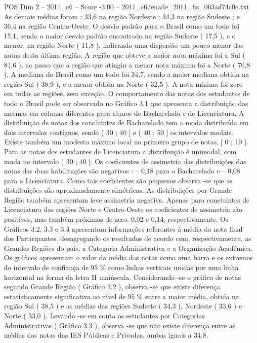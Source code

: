 \begin{textsample}{POS Dim 2 – 2011\_c6 – Score -3.00 – 2011\_c6/enade\_2011\_fis\_063ad74c0e.txt}
As demais médias foram : 33,6 na região Nordeste ; 34,3 na região Sudeste ; e 36,4 na região Centro-Oeste.
O desvio padrão para o Brasil como um todo foi 15,1, sendo o maior desvio padrão encontrado na região Sudeste ( 17,5 ), e o menor, na região Norte ( 11,8 ), indicando uma dispersão um pouco menor das notas desta última região.
A região que obteve a maior nota máxima foi a Sul ( 81,6 ), ao passo que a região que atingiu a menor nota máxima foi a Norte ( 70,8 ).
A mediana do Brasil como um todo foi 34,7, sendo a maior mediana obtida na região Sul ( 38,9 ), e a menor obtida na Norte ( 32,5 ).
A nota mínima foi zero em todas as regiões, sem exceção.
O comportamento das notas dos estudantes de todo o Brasil pode ser observado no Gráfico 3.1 que apresenta a distribuição das mesmas em colunas diferentes para alunos de Bacharelado e de Licenciatura.
A distribuição de notas dos concluintes de Bacharelado tem a moda distribuída em dois intervalos contíguos, sendo ( 30 ; 40 ] e ( 40 ; 50 ] os intervalos modais.
Existe também um modesto máximo local no primeiro grupo de notas, [ 0 ; 10 ].
Para as notas dos estudantes de Licenciatura a distribuição é unimodal, com moda no intervalo ( 30 ; 40 ].
Os coeficientes de assimetria das distribuições das notas das duas habilitações são negativos : – 0,18 para o Bacharelado e – 0,08 para a Licenciatura.
Como tais coeficientes são pequenos observa -se que as distribuições são aproximadamente simétricas.
As distribuições por Grande Região também apresentam leve assimetria negativa.
Apenas para concluintes de Licenciatura das regiões Norte e Centro-Oeste os coeficientes de assimetria são positivos, mas também próximos de zero, 0,02 e 0,14, respectivamente.
Os Gráficos 3.2, 3.3 e 3.4 apresentam informações referentes à média da nota final dos Participantes, desagregando os resultados de acordo com, respectivamente, as Grandes Regiões do país, a Categoria Administrativa e a Organização Acadêmica.
Os gráficos apresentam o valor da média das notas como uma barra e os extremos do intervalo de confiança de 95 \% como linhas verticais unidas por uma linha horizontal na forma da letra H maiúscula.
Considerando -se o gráfico de notas segundo Grande Região ( Gráfico 3.2 ), observa -se que existe diferença estatisticamente significativa ao nível de 95 \% entre a maior média, obtida na região Sul ( 38,5 ) e as médias das regiões Sudeste ( 34,3 ), Nordeste ( 33,6 ) e Norte ( 33,0 ).
Levando -se em conta os estudantes por Categorias Administrativas ( Gráfico 3.3 ), observa -se que não existe diferença entre as médias das notas das IES Públicas e Privadas, ambas iguais a 34,8.

\end{textsample}
